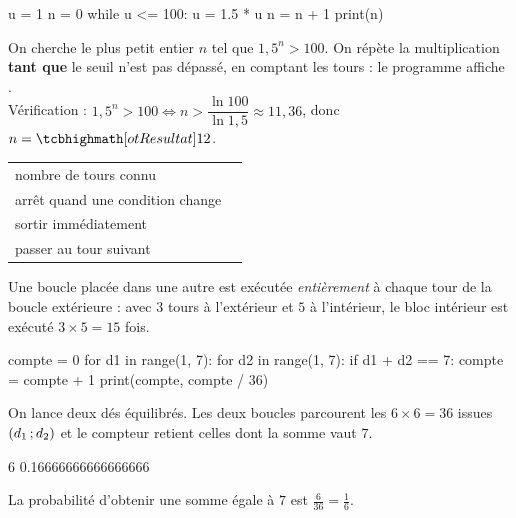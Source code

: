 \begin{savoirfaire}
\begin{codecote}[0.42]
\begin{pythoncol}
u = 1
n = 0
while u <= 100:
    u = 1.5 * u
    n = n + 1
print(n)
\end{pythoncol}
\cote
On cherche le plus petit entier $n$ tel que $1{,}5^{n}>100$. On répète la multiplication \textbf{tant que} le seuil n'est pas dépassé,
en comptant les tours : le programme affiche .\\[1mm]
Vérification : $1{,}5^{n}>100\iff n>\dfrac{\ln100}{\ln1{,}5}\approx11{,}36$, donc $n=\res{12}$.
\end{codecote}
\end{savoirfaire}


\noindent
\begin{minipage}[t]{0.5\linewidth}\vspace{0pt}
{\renewcommand{\arraystretch}{1.35}%
\begin{tabularx}{\linewidth}{@{}YY@{}}
\toprule
{} &  \\
\midrule
nombre de tours connu &  \\
arrêt quand une condition change &  \\
sortir immédiatement &  \\
passer au tour suivant &  \\
\bottomrule
\end{tabularx}}
\end{minipage}\hfill
\begin{minipage}[t]{0.46\linewidth}\vspace{0pt}
\begin{propriete}
\raggedright
Une boucle placée dans une autre est exécutée \emph{entièrement} à chaque tour de la boucle extérieure : avec $3$ tours à l'extérieur
et $5$ à l'intérieur, le bloc intérieur est exécuté $3\times5=15$ fois.
\end{propriete}
\end{minipage}

\begin{exemple}
\begin{codecote}[0.46]
\begin{pythoncol}
compte = 0
for d1 in range(1, 7):
    for d2 in range(1, 7):
        if d1 + d2 == 7:
            compte = compte + 1
print(compte, compte / 36)
\end{pythoncol}
\cote
On lance deux dés équilibrés. Les deux boucles parcourent les $6\times6=36$ issues $(d_1\,{;}\, d_2)$ et le compteur retient celles dont
la somme vaut $7$.
\begin{consolecol}
6 0.16666666666666666
\end{consolecol}

\smallskip
La probabilité d'obtenir une somme égale à $7$ est $\frac{6}{36}=\frac16$.
\end{codecote}
\end{exemple}

